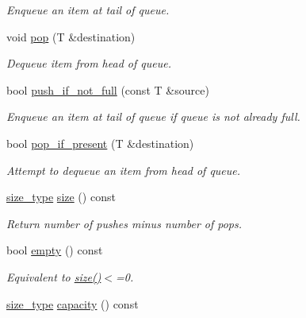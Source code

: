 \begin{DoxyCompactItemize}
\begin{DoxyCompactList}\small\item\em Enqueue an item at tail of queue. \end{DoxyCompactList}\item 
void \hyperlink{classtbb_1_1concurrent__queue_aeef54c0906b144225ae492bd9d5a821c}{pop} (T \&destination)
\begin{DoxyCompactList}\small\item\em Dequeue item from head of queue. \end{DoxyCompactList}\item 
bool \hyperlink{classtbb_1_1concurrent__queue_ae532012dcef8ecb53f7760c537514614}{push\+\_\+if\+\_\+not\+\_\+full} (const T \&source)
\begin{DoxyCompactList}\small\item\em Enqueue an item at tail of queue if queue is not already full. \end{DoxyCompactList}\item 
bool \hyperlink{classtbb_1_1concurrent__queue_a396a1e250b0a7101f29fea41b6f25ed6}{pop\+\_\+if\+\_\+present} (T \&destination)
\begin{DoxyCompactList}\small\item\em Attempt to dequeue an item from head of queue. \end{DoxyCompactList}\item 
\hyperlink{classtbb_1_1concurrent__queue_aa697402bd9583bd4f26dfd3a912a39d1}{size\+\_\+type} \hyperlink{classtbb_1_1concurrent__queue_ac9737cf846c3fa6688414bb29c7b1e81}{size} () const 
\begin{DoxyCompactList}\small\item\em Return number of pushes minus number of pops. \end{DoxyCompactList}\item 
\hypertarget{classtbb_1_1concurrent__queue_a6f00654db010c950b8441ba006d32045}{}bool \hyperlink{classtbb_1_1concurrent__queue_a6f00654db010c950b8441ba006d32045}{empty} () const \label{classtbb_1_1concurrent__queue_a6f00654db010c950b8441ba006d32045}

\begin{DoxyCompactList}\small\item\em Equivalent to \hyperlink{classtbb_1_1concurrent__queue_ac9737cf846c3fa6688414bb29c7b1e81}{size()}$<$=0. \end{DoxyCompactList}\item 
\hypertarget{classtbb_1_1concurrent__queue_a7dee674e4226c53b5bd2de6d7f4c37b8}{}\hyperlink{classtbb_1_1concurrent__queue_aa697402bd9583bd4f26dfd3a912a39d1}{size\+\_\+type} \hyperlink{classtbb_1_1concurrent__queue_a7dee674e4226c53b5bd2de6d7f4c37b8}{capacity} () const \label{classtbb_1_1concurrent__queue_a7dee674e4226c53b5bd2de6d7f4c37b8}


\end{DoxyCompactItemize}
